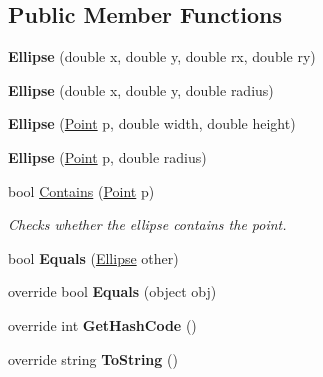 \subsection*{Public Member Functions}
\begin{DoxyCompactItemize}
\item 
\mbox{\label{class_s_g_l_1_1_ellipse_ab7c43658b938824f2f89241e5d2a1a3e}} 
{\bfseries Ellipse} (double x, double y, double rx, double ry)
\item 
\mbox{\label{class_s_g_l_1_1_ellipse_a7e84a523ff15e2de67f636bc8f832594}} 
{\bfseries Ellipse} (double x, double y, double radius)
\item 
\mbox{\label{class_s_g_l_1_1_ellipse_ab4aaaa32ad5f69a406fd31cce901b0af}} 
{\bfseries Ellipse} (\mbox{\hyperlink{struct_s_g_l_1_1_point}{Point}} p, double width, double height)
\item 
\mbox{\label{class_s_g_l_1_1_ellipse_a62eb72ea81594ca6e2449466493d6204}} 
{\bfseries Ellipse} (\mbox{\hyperlink{struct_s_g_l_1_1_point}{Point}} p, double radius)
\item 
bool \mbox{\hyperlink{class_s_g_l_1_1_ellipse_a4aa98efe82607feabecf228d21339e00}{Contains}} (\mbox{\hyperlink{struct_s_g_l_1_1_point}{Point}} p)
\begin{DoxyCompactList}\small\item\em Checks whether the ellipse contains the point. \end{DoxyCompactList}\item 
\mbox{\label{class_s_g_l_1_1_ellipse_a9357f80bbe482175b1a7c6e4ece54456}} 
bool {\bfseries Equals} (\mbox{\hyperlink{class_s_g_l_1_1_ellipse}{Ellipse}} other)
\item 
\mbox{\label{class_s_g_l_1_1_ellipse_ad54b2bf09ec36069e1826535d0fc363a}} 
override bool {\bfseries Equals} (object obj)
\item 
\mbox{\label{class_s_g_l_1_1_ellipse_aa04cd2fefc7a4a920406af242025eb6d}} 
override int {\bfseries Get\+Hash\+Code} ()
\item 
\mbox{\label{class_s_g_l_1_1_ellipse_ae24cbc23530de4b3dd1ac46b79216864}} 
override string {\bfseries To\+String} ()
\end{DoxyCompactItemize}
